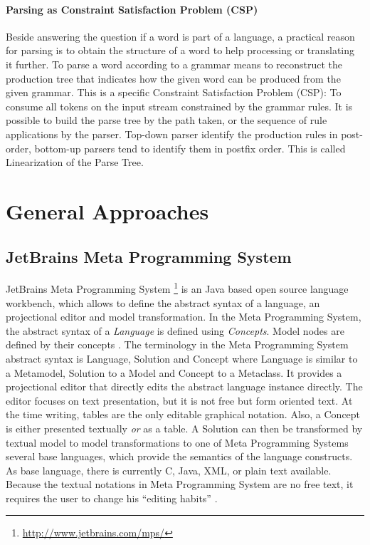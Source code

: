 \paragraph{Parsing as Constraint Satisfaction Problem (CSP)} 
Beside answering the question if a word is part of a language, a practical reason for parsing is to obtain the structure of a word to help processing or translating it further. To parse a word according to a grammar means to reconstruct the production tree that indicates how the given word can be produced from the given grammar. This is a specific Constraint Satisfaction Problem (CSP): To consume all tokens on the input stream constrained by the grammar rules. It is possible to build the parse tree by the path taken, or the sequence of rule applications by the parser.  Top-down parser identify the production rules in post-order, bottom-up parsers tend to identify them in postfix order. This is called Linearization of the Parse Tree. \cite{ParserBook}



\section{General Approaches} 


\subsection{JetBrains Meta Programming System}
JetBrains Meta Programming System \footnote{\raggedright \url{http://www.jetbrains.com/mps/}}  is an Java based open source language workbench, which allows to define the abstract syntax of a language, an projectional editor and model transformation. In the Meta Programming System, the abstract syntax of a \emph{Language} is defined using \emph{Concepts}. Model nodes are defined by their concepts \cite{MPStut}. The terminology in the Meta Programming System abstract syntax is Language, Solution and Concept where Language is similar to a Metamodel, Solution to a Model and Concept to a Metaclass. It provides a projectional editor that directly edits the abstract language instance directly. The editor focuses on text presentation, but it is not free but form oriented text. At the time writing, tables are the only editable graphical notation. Also, a Concept is either presented textually \emph{or} as a table. A Solution can then be transformed by textual model to model transformations to one of  Meta Programming Systems several base languages, which provide the semantics of the language constructs. As base language, there is currently C, Java, XML, or plain text available. Because the textual notations in Meta Programming System are no free text, it requires the user to change his ``editing habits'' \cite{VolterMPS}. 

